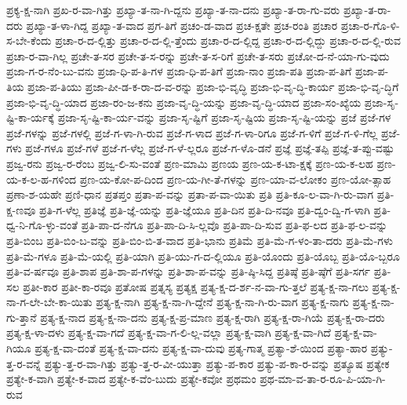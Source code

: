 {ಪ್ರಕ್ಯ-ಕ್ಷ-ನಾಗಿ
ಪ್ರಖ-ರ-ವಾ-ಗಿತ್ತು
ಪ್ರಖ್ಯಾ-ತ-ನಾ-ಗಿ-ದ್ದನು
ಪ್ರಖ್ಯಾ-ತ-ನಾ-ದನು
ಪ್ರಖ್ಯಾ-ತ-ರಾ-ಗು-ವರು
ಪ್ರಖ್ಯಾ-ತ-ರಾ-ದರು
ಪ್ರಖ್ಯಾ-ತ-ಳಾ-ಗಿದ್ದ
ಪ್ರಖ್ಯಾ-ತ-ವಾದ
ಪ್ರಗ-ತಿಗೆ
ಪ್ರಚಂ-ಡ-ವಾದ
ಪ್ರಚ-ಕ್ಷತೇ
ಪ್ರಚ-ರಂತಿ
ಪ್ರಚಾರ
ಪ್ರಚಾ-ರ-ಗೊ-ಳಿ-ಸ-ಬೇ-ಕೆಂದು
ಪ್ರಚಾ-ರ-ದ-ಲ್ಲಿತ್ತು
ಪ್ರಚಾ-ರ-ದ-ಲ್ಲಿ-ತ್ತೆಂದು
ಪ್ರಚಾ-ರ-ದ-ಲ್ಲಿದ್ದ
ಪ್ರಚಾ-ರ-ದ-ಲ್ಲಿದ್ದು
ಪ್ರಚಾ-ರ-ದ-ಲ್ಲಿ-ರುವ
ಪ್ರಚಾ-ರ-ವಾ-ಗಿಲ್ಲ
ಪ್ರಚೇ-ತ-ಸರ
ಪ್ರಚೇ-ತ-ಸ-ರನ್ನು
ಪ್ರಚೇ-ತ-ಸ-ರಿಗೆ
ಪ್ರಚೇ-ತ-ಸರು
ಪ್ರಚೋ-ದ-ನೆ-ಯಾ-ಗು-ವುದು
ಪ್ರಜಾ-ಗ-ರ-ನೆಂ-ಬು-ವನು
ಪ್ರಜಾ-ಧಿ-ಪ-ತಿ-ಗಳ
ಪ್ರಜಾ-ಧಿ-ಪ-ತಿಗೆ
ಪ್ರಜಾ-ನಾಂ
ಪ್ರಜಾ-ಪತಿ
ಪ್ರಜಾ-ಪ-ತಿಗೆ
ಪ್ರಜಾ-ಪ-ತಿಯ
ಪ್ರಜಾ-ಪ-ತಿಯು
ಪ್ರಜಾ-ಪೀ-ಡ-ಕ-ರಾ-ದ-ವ-ರನ್ನು
ಪ್ರಜಾ-ಭಿ-ವೃದ್ಧಿ
ಪ್ರಜಾ-ಭಿ-ವೃ-ದ್ಧಿ-ಕಾರ್ಯ
ಪ್ರಜಾ-ಭಿ-ವೃ-ದ್ಧಿಗೆ
ಪ್ರಜಾ-ಭಿ-ವೃ-ದ್ಧಿ-ಯಾದ
ಪ್ರಜಾ-ರಂ-ಜ-ಕನು
ಪ್ರಜಾ-ವೃ-ದ್ಧಿ-ಯನ್ನು
ಪ್ರಜಾ-ವೃ-ದ್ಧಿ-ಯಾದ
ಪ್ರಜಾ-ಸಂ-ಖ್ಯೆಯ
ಪ್ರಜಾ-ಸೃ-ಷ್ಟಿ-ಕಾ-ರ್ಯಕ್ಕೆ
ಪ್ರಜಾ-ಸೃ-ಷ್ಟಿ-ಕಾ-ರ್ಯ-ವನ್ನು
ಪ್ರಜಾ-ಸೃ-ಷ್ಟಿಗೆ
ಪ್ರಜಾ-ಸೃ-ಷ್ಟಿಯ
ಪ್ರಜಾ-ಸೃ-ಷ್ಟಿ-ಯನ್ನು
ಪ್ರಜೆ
ಪ್ರಜೆ-ಗಳ
ಪ್ರಜೆ-ಗಳನ್ನು
ಪ್ರಜೆ-ಗಳಲ್ಲಿ
ಪ್ರಜೆ-ಗ-ಳಾ-ಗಿ-ರುವ
ಪ್ರಜೆ-ಗ-ಳಾದ
ಪ್ರಜೆ-ಗ-ಳಾ-ರಿಗೂ
ಪ್ರಜೆ-ಗ-ಳಿಗೆ
ಪ್ರಜೆ-ಗ-ಳಿ-ಗೆಲ್ಲ
ಪ್ರಜೆ-ಗಳು
ಪ್ರಜೆ-ಗಳೂ
ಪ್ರಜೆ-ಗಳೆ
ಪ್ರಜೆ-ಗ-ಳೆಲ್ಲ
ಪ್ರಜೆ-ಗ-ಳೆ-ಲ್ಲರೂ
ಪ್ರಜೆ-ಗ-ಳೊ-ಡನೆ
ಪ್ರಜ್ಞೆ
ಪ್ರಜ್ಞೆ-ತಪ್ಪಿ
ಪ್ರಜ್ಞೆ-ತ-ಪ್ಪು-ವಷ್ಟು
ಪ್ರಜ್ವ-ರನು
ಪ್ರಜ್ವ-ರ-ರೆಂಬ
ಪ್ರಜ್ವ-ಲಿ-ಸು-ವಂತೆ
ಪ್ರಣ-ಮಾಮಿ
ಪ್ರಣಯ
ಪ್ರಣ-ಯ-ಕ-ಟಾ-ಕ್ಷಕ್ಕೆ
ಪ್ರಣ-ಯ-ಕ-ಲಹ
ಪ್ರಣ-ಯ-ಕ-ಲ-ಹ-ಗಳಿಂದ
ಪ್ರಣ-ಯ-ಕೋ-ಪ-ದಿಂದ
ಪ್ರಣ-ಯ-ಗೀ-ತೆ-ಗಳನ್ನು
ಪ್ರಣ-ಯಾ-ವ-ಲೋಕಂ
ಪ್ರಣ-ಯೋ-ತ್ಸಾಹ
ಪ್ರಣಾ-ಶ-ಯಹೇ
ಪ್ರಣಿ-ಧಾನ
ಪ್ರತಪ್ತಂ
ಪ್ರತಾ-ಪ-ವನ್ನು
ಪ್ರತಾ-ಪ-ವಾ-ಯಿತು
ಪ್ರತಿ
ಪ್ರತಿ-ಕೂ-ಲ-ವಾ-ಗಿ-ರು-ವಾಗ
ಪ್ರತಿ-ಕ್ಷ-ಣವೂ
ಪ್ರತಿ-ಗ-ಳೆಲ್ಲ
ಪ್ರತಿಜ್ಞೆ
ಪ್ರತಿ-ಜ್ಞೆ-ಯನ್ನು
ಪ್ರತಿ-ಜ್ಞೆಯೂ
ಪ್ರತಿ-ದಿನ
ಪ್ರತಿ-ದಿ-ನವೂ
ಪ್ರತಿ-ದ್ವಂ-ದ್ವಿ-ಗ-ಳಾಗಿ
ಪ್ರತಿ-ಧ್ವ-ನಿ-ಗೊ-ಳ್ಳು-ವಂತೆ
ಪ್ರತಿ-ಪಾ-ದ-ನೆಗೂ
ಪ್ರತಿ-ಪಾ-ದಿ-ಸಿ-ಲ್ಲವೊ
ಪ್ರತಿ-ಪಾ-ದಿ-ಸುವ
ಪ್ರತಿ-ಫ-ಲದ
ಪ್ರತಿ-ಫ-ಲ-ವನ್ನು
ಪ್ರತಿ-ಬಿಂಬ
ಪ್ರತಿ-ಬಿಂ-ಬ-ವನ್ನು
ಪ್ರತಿ-ಬಿಂ-ಬಿ-ತ-ವಾದ
ಪ್ರತಿ-ಭಾನು
ಪ್ರತಿಮೆ
ಪ್ರತಿ-ಮೆ-ಗ-ಳಂ-ತಾ-ದರು
ಪ್ರತಿ-ಮೆ-ಗಳು
ಪ್ರತಿ-ಮೆ-ಗಳೂ
ಪ್ರತಿ-ಮೆ-ಯಲ್ಲಿ
ಪ್ರತಿ-ಯಾಗಿ
ಪ್ರತಿ-ಯು-ಗ-ದ-ಲ್ಲಿಯೂ
ಪ್ರತಿ-ಯೊಂದು
ಪ್ರತಿ-ಯೊಬ್ಬ
ಪ್ರತಿ-ಯೊ-ಬ್ಬರೂ
ಪ್ರತಿ-ವ-ರ್ಷವೂ
ಪ್ರತಿ-ಶಾಪ
ಪ್ರತಿ-ಶಾ-ಪ-ಗಳನ್ನು
ಪ್ರತಿ-ಶಾ-ಪ-ವನ್ನು
ಪ್ರತಿ-ಷ್ಠಿ-ಸಿದ್ದ
ಪ್ರತಿಷ್ಠೆ
ಪ್ರತಿ-ಷ್ಠೆಗೆ
ಪ್ರತಿ-ಸರ್ಗ
ಪ್ರತಿ-ಸಲ
ಪ್ರತೀ-ಕಾರ
ಪ್ರತೀ-ಕಾ-ರವೂ
ಪ್ರತೋಷ
ಪ್ರತ್ನಸ್ಯ
ಪ್ರತ್ಯಕ್ಷ
ಪ್ರತ್ಯ-ಕ್ಷ-ದ-ರ್ಶ-ನ-ವಾ-ಗು-ತ್ತಲೆ
ಪ್ರತ್ಯ-ಕ್ಷ-ನಾ-ಗಲು
ಪ್ರತ್ಯ-ಕ್ಷ-ನಾ-ಗ-ಲೇ-ಬೇ-ಕಾ-ಯಿತು
ಪ್ರತ್ಯ-ಕ್ಷ-ನಾಗಿ
ಪ್ರತ್ಯ-ಕ್ಷ-ನಾ-ಗಿ-ದ್ದೇನೆ
ಪ್ರತ್ಯ-ಕ್ಷ-ನಾ-ಗಿ-ರು-ವಾಗ
ಪ್ರತ್ಯ-ಕ್ಷ-ನಾಗು
ಪ್ರತ್ಯ-ಕ್ಷ-ನಾ-ಗು-ತ್ತಾನೆ
ಪ್ರತ್ಯ-ಕ್ಷ-ನಾದ
ಪ್ರತ್ಯ-ಕ್ಷ-ನಾ-ದನು
ಪ್ರತ್ಯ-ಕ್ಷ-ಪ್ರ-ಮಾಣ
ಪ್ರತ್ಯ-ಕ್ಷ-ರಾಗಿ
ಪ್ರತ್ಯ-ಕ್ಷ-ರಾ-ಗಿಯೆ
ಪ್ರತ್ಯ-ಕ್ಷ-ರಾ-ದರು
ಪ್ರತ್ಯ-ಕ್ಷ-ಳಾ-ದಳು
ಪ್ರತ್ಯ-ಕ್ಷ-ವಾ-ಗದೆ
ಪ್ರತ್ಯ-ಕ್ಷ-ವಾ-ಗ-ಲಿ-ಲ್ಲ-ವಲ್ಲಾ
ಪ್ರತ್ಯ-ಕ್ಷ-ವಾಗಿ
ಪ್ರತ್ಯ-ಕ್ಷ-ವಾ-ಗಿದೆ
ಪ್ರತ್ಯ-ಕ್ಷ-ವಾ-ಗಿಯೂ
ಪ್ರತ್ಯ-ಕ್ಷ-ವಾ-ದಂತೆ
ಪ್ರತ್ಯ-ಕ್ಷ-ವಾ-ದನು
ಪ್ರತ್ಯ-ಕ್ಷ-ವಾ-ದುವು
ಪ್ರತ್ಯ-ಗಾತ್ಮ
ಪ್ರತ್ಯಾ-ಶೆ-ಯಿಂದ
ಪ್ರತ್ಯಾ-ಹಾರ
ಪ್ರತ್ಯು-ತ್ತ-ರ-ವನ್ನೆ
ಪ್ರತ್ಯು-ತ್ತ-ರ-ವಾ-ಗಿತ್ತು
ಪ್ರತ್ಯು-ತ್ತ-ರ-ವೀ-ಯುತ್ತಾ
ಪ್ರತ್ಯು-ಪ-ಕಾರ
ಪ್ರತ್ಯು-ಪ-ಕಾ-ರ-ವನ್ನು
ಪ್ರತ್ಯೂಷ
ಪ್ರತ್ಯೇಕ
ಪ್ರತ್ಯೇ-ಕ-ವಾಗಿ
ಪ್ರತ್ಯೇ-ಕ-ವಾದ
ಪ್ರತ್ಯೇ-ಕ-ವೆಂ-ಬುದು
ಪ್ರತ್ಯೇ-ಕವೋ
ಪ್ರಥಮಂ
ಪ್ರಥ-ಮಾ-ವ-ತಾ-ರ-ರೂ-ಪಿ-ಯಾ-ಗಿ-ರುವ
}
